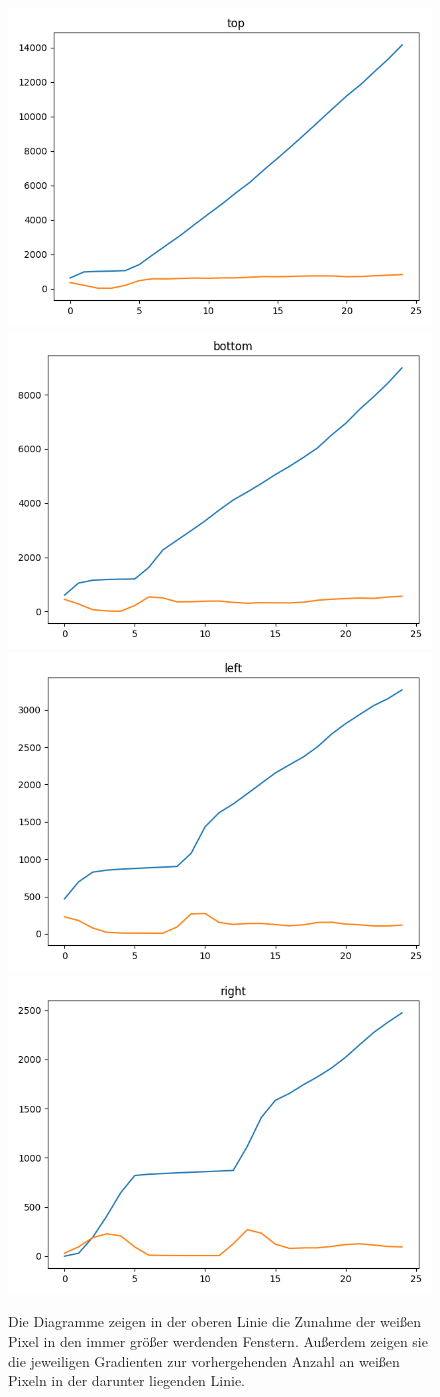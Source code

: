 \begin{figure}
	\centering
	\includegraphics[width=0.3\linewidth]{images/plot_frame/plot_top_frame.png}
	\includegraphics[width=0.3\linewidth]{images/plot_frame/plot_bottom_frame.png}\\
	\includegraphics[width=0.3\linewidth]{images/plot_frame/plot_left_frame.png}
	\includegraphics[width=0.3\linewidth]{images/plot_frame/plot_right_frame.png}
	\caption{Die Diagramme zeigen in der oberen Linie die Zunahme der weißen Pixel in den immer größer werdenden Fenstern. Außerdem zeigen sie die jeweiligen Gradienten zur vorhergehenden Anzahl an weißen Pixeln in der darunter liegenden Linie.}
	\label{fig:bordergradient}
\end{figure}    